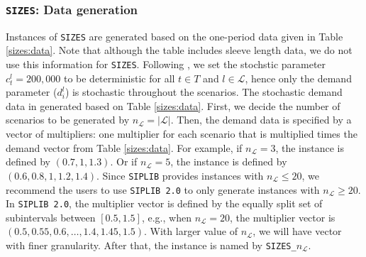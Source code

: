\subsubsection{\texttt{SIZES}: Data generation}
Instances of \texttt{SIZES} are generated based on the one-period data given in Table \ref{sizes:data}. Note that although the table includes sleeve length data, we do not use this information for \texttt{SIZES}. Following \cite{journal:JSW1999}, we set the stochstic parameter $c_t^l=200,000$ to be deterministic for all $t\in T$ and $l\in\mathcal{L}$, hence only the demand parameter ($d_i^l$) is stochastic throughout the scenarios. The stochastic demand data in generated based on Table \ref{sizes:data}. First, we decide the number of scenarios to be generated by $n_\mathcal{L}=|\mathcal{L}|$. Then, the demand data is specified by a vector of multipliers: one multiplier for each scenario that is multiplied times the demand vector from Table \ref{sizes:data}. For example, if $n_\mathcal{L}=3$, the instance is defined by $(0.7,1,1.3)$. Or if $n_\mathcal{L}=5$, the instance is defined by $(0.6,0.8,1,1.2,1.4)$. Since \texttt{SIPLIB} provides instances with $n_\mathcal{L}\le 20$, we recommend the users to use \texttt{SIPLIB 2.0} to only generate instances with $n_\mathcal{L} \ge 20$. In \texttt{SIPLIB 2.0}, the multiplier vector is defined by the equally split set of subintervals between $[0.5,1.5]$, e.g., when $n_\mathcal{L}=20$, the multiplier vector is $(0.5,0.55,0.6,\ldots,1.4,1.45,1.5)$. With larger value of $n_\mathcal{L}$, we will have vector with finer granularity. After that, the instance is named by \texttt{SIZES\_$n_\mathcal{L}$}.

